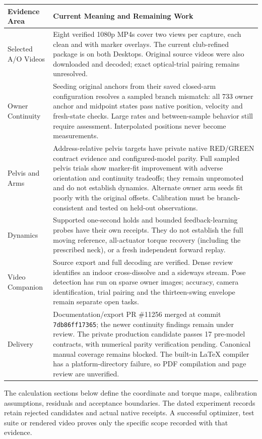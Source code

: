 \documentclass[11pt,a4paper]{article}
\begin{document}
\begin{tabularx}{\textwidth}{@{}p{}X@{}}
\toprule
Evidence Area & Current Meaning and Remaining Work \\
\midrule
Selected A/O Videos & Eight verified 1080p MP4s cover two views per
capture, each clean and with marker overlays. The current club-refined
package is on both Desktops. Original source videos were also downloaded
and decoded; exact optical-trial pairing remains unresolved. \\
Owner Continuity & Seeding original anchors from their saved closed-arm
configuration resolves a sampled branch mismatch: all 733 owner anchor
and midpoint states pass native position, velocity and fresh-state checks.
Large rates and between-sample behavior still require assessment.
Interpolated positions never become measurements. \\
Pelvis and Arms & Address-relative pelvis targets have private native
RED/GREEN contract evidence and configured-model parity. Full sampled
pelvis trials show marker-fit improvement with adverse orientation and
continuity tradeoffs; they remain unpromoted and do not establish dynamics. Alternate owner arm seeds fit poorly with the
original offsets. Calibration must be branch-consistent and tested on
held-out observations. \\
Dynamics & Supported one-second holds and bounded feedback-learning
probes have their own receipts. They do not establish the full moving
reference, all-actuator torque recovery (including the prescribed neck),
or a fresh independent forward replay. \\
Video Companion & Source export and full decoding are verified.
Dense review identifies an indoor cross-dissolve and a sideways stream.
Pose detection has run on sparse owner images; accuracy, camera
identification, trial pairing and the thirteen-swing envelope remain
separate open tasks. \\
Delivery & Documentation/export PR \#11256 merged at commit
\texttt{7db86ff17365}; the newer continuity findings remain under review.
The private production candidate passes 17 pre-model contracts, with
numerical parity verification pending. Canonical manual coverage remains
blocked. The built-in LaTeX compiler has a platform-directory failure,
so PDF compilation and page review are unverified. \\
\bottomrule
\end{tabularx}

The calculation sections below define the coordinate and torque maps,
calibration assumptions, residuals and acceptance boundaries. The dated
experiment records retain rejected candidates and actual native receipts.
A successful optimizer, test suite or rendered video proves only the
specific scope recorded with that evidence.
\end{document}
